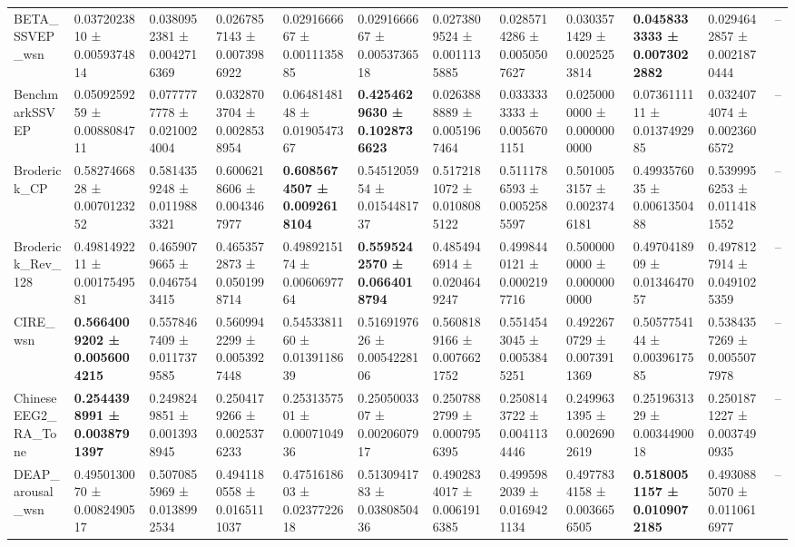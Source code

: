 \begin{table}[htbp]
\begin{tabular}{llllllllllll}
BETA_SSVEP_wsn & 0.0372023810 ± 0.0059374814 & 0.0380952381 ± 0.0042716369 & 0.0267857143 ± 0.0073986922 & 0.0291666667 ± 0.0011135885 & 0.0291666667 ± 0.0053736518 & 0.0273809524 ± 0.0011135885 & 0.0285714286 ± 0.0050507627 & 0.0303571429 ± 0.0025253814 & \bfseries 0.0458333333 ± 0.0073022882 & 0.0294642857 ± 0.0021870444 & -- \\
BenchmarkSSVEP & 0.0509259259 ± 0.0088084711 & 0.0777777778 ± 0.0210024004 & 0.0328703704 ± 0.0028538954 & 0.0648148148 ± 0.0190547367 & \bfseries 0.4254629630 ± 0.1028736623 & 0.0263888889 ± 0.0051967464 & 0.0333333333 ± 0.0056701151 & 0.0250000000 ± 0.0000000000 & 0.0736111111 ± 0.0137492985 & 0.0324074074 ± 0.0023606572 & -- \\
Broderick_CP & 0.5827466828 ± 0.0070123252 & 0.5814359248 ± 0.0119883321 & 0.6006218606 ± 0.0043467977 & \bfseries 0.6085674507 ± 0.0092618104 & 0.5451205954 ± 0.0154481737 & 0.5172181072 ± 0.0108085122 & 0.5111786593 ± 0.0052585597 & 0.5010053157 ± 0.0023746181 & 0.4993576035 ± 0.0061350488 & 0.5399956253 ± 0.0114181552 & -- \\
Broderick_Rev_128 & 0.4981492211 ± 0.0017549581 & 0.4659079665 ± 0.0467543415 & 0.4653572873 ± 0.0501998714 & 0.4989215174 ± 0.0060697764 & \bfseries 0.5595242570 ± 0.0664018794 & 0.4854946914 ± 0.0204649247 & 0.4998440121 ± 0.0002197716 & 0.5000000000 ± 0.0000000000 & 0.4970418909 ± 0.0134647057 & 0.4978127914 ± 0.0491025359 & -- \\
CIRE_wsn & \bfseries 0.5664009202 ± 0.0056004215 & 0.5578467409 ± 0.0117379585 & 0.5609942299 ± 0.0053927448 & 0.5453381160 ± 0.0139118639 & 0.5169197626 ± 0.0054228106 & 0.5608189166 ± 0.0076621752 & 0.5514543045 ± 0.0053845251 & 0.4922670729 ± 0.0073911369 & 0.5057754144 ± 0.0039617585 & 0.5384357269 ± 0.0055077978 & -- \\
ChineseEEG2_RA_Tone & \bfseries 0.2544398991 ± 0.0038791397 & 0.2498249851 ± 0.0013938945 & 0.2504179266 ± 0.0025376233 & 0.2531357501 ± 0.0007104936 & 0.2505003307 ± 0.0020607917 & 0.2507882799 ± 0.0007956395 & 0.2508143722 ± 0.0041134446 & 0.2499631395 ± 0.0026902619 & 0.2519631329 ± 0.0034490018 & 0.2501871227 ± 0.0037490935 & -- \\
DEAP_arousal_wsn & 0.4950130070 ± 0.0082490517 & 0.5070855969 ± 0.0138992534 & 0.4941180558 ± 0.0165111037 & 0.4751618603 ± 0.0237722618 & 0.5130941783 ± 0.0380850436 & 0.4902834017 ± 0.0061916385 & 0.4995982039 ± 0.0169421134 & 0.4977834158 ± 0.0036656505 & \bfseries 0.5180051157 ± 0.0109072185 & 0.4930885070 ± 0.0110616977 & -- \\

\end{tabular}
\end{table}
